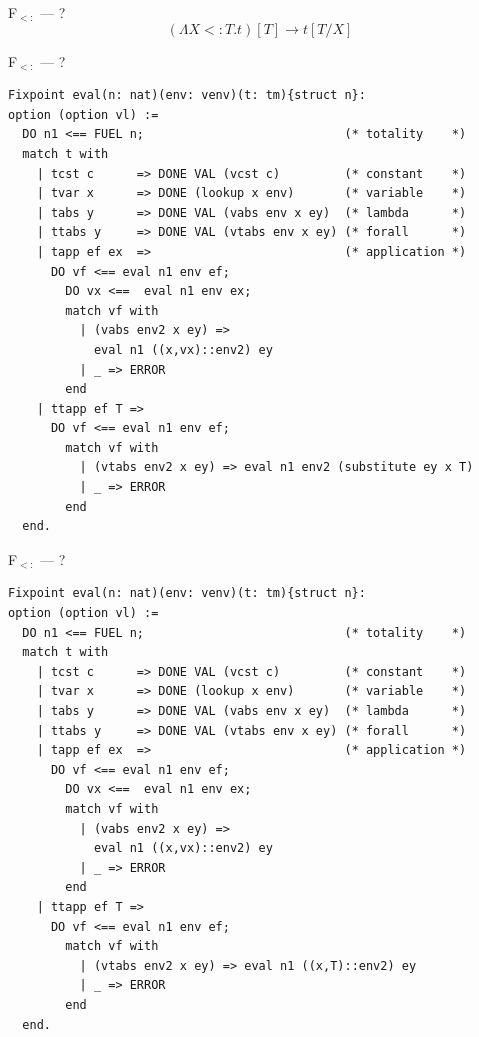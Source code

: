 \documentclass{beamer}
\begin{document}
\begin{frame}[fragile]{F$_{<:}$ --- ?}
$$  (\Lambda X<:T.t) [T] \longrightarrow t[T/X]$$
\end{frame}

\begin{frame}[fragile]{F$_{<:}$ --- ?}
\begin{lstlisting}[keywords={}]
Fixpoint eval(n: nat)(env: venv)(t: tm){struct n}: 
option (option vl) :=
  DO n1 <== FUEL n;                            (* totality    *)
  match t with
    | tcst c      => DONE VAL (vcst c)         (* constant    *)
    | tvar x      => DONE (lookup x env)       (* variable    *)
    | tabs y      => DONE VAL (vabs env x ey)  (* lambda      *)
    | ttabs y     => DONE VAL (vtabs env x ey) (* forall      *)
    | tapp ef ex  =>                           (* application *)
      DO vf <== eval n1 env ef;
        DO vx <==  eval n1 env ex;
        match vf with
          | (vabs env2 x ey) =>
            eval n1 ((x,vx)::env2) ey
          | _ => ERROR
        end
    | ttapp ef T =>
      DO vf <== eval n1 env ef;
        match vf with
          | (vtabs env2 x ey) => eval n1 env2 (substitute ey x T)
          | _ => ERROR
        end
  end.
\end{lstlisting}
\end{frame}


\begin{frame}[fragile]{F$_{<:}$ --- ?}
\begin{lstlisting}[keywords={}]
Fixpoint eval(n: nat)(env: venv)(t: tm){struct n}: 
option (option vl) :=
  DO n1 <== FUEL n;                            (* totality    *)
  match t with
    | tcst c      => DONE VAL (vcst c)         (* constant    *)
    | tvar x      => DONE (lookup x env)       (* variable    *)
    | tabs y      => DONE VAL (vabs env x ey)  (* lambda      *)
    | ttabs y     => DONE VAL (vtabs env x ey) (* forall      *)
    | tapp ef ex  =>                           (* application *)
      DO vf <== eval n1 env ef;
        DO vx <==  eval n1 env ex;
        match vf with
          | (vabs env2 x ey) =>
            eval n1 ((x,vx)::env2) ey
          | _ => ERROR
        end
    | ttapp ef T =>
      DO vf <== eval n1 env ef;
        match vf with
          | (vtabs env2 x ey) => eval n1 ((x,T)::env2) ey
          | _ => ERROR
        end
  end.
\end{lstlisting}
\end{frame}
\end{document}
